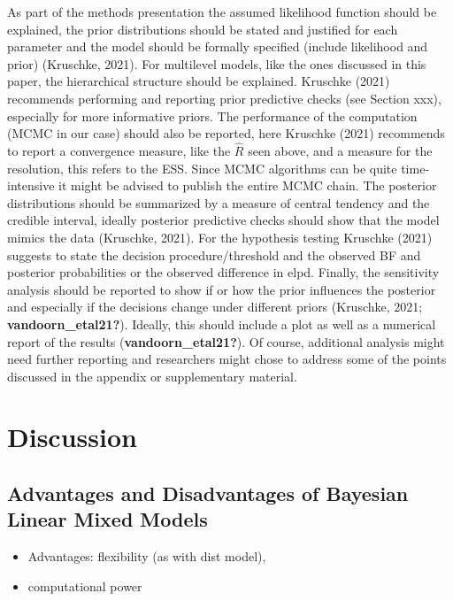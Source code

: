 \documentclass[
  doc,12pt,floatsintext]{apa7}
\providecommand{\tightlist}{%
  \setlength{\itemsep}{0pt}\setlength{\parskip}{0pt}}
\begin{document}
As part of the methods presentation the assumed likelihood function should be explained, the prior distributions should be stated and justified for each parameter and the model should be formally specified (include likelihood and prior) (Kruschke, 2021). For multilevel models, like the ones discussed in this paper, the hierarchical structure should be explained. Kruschke (2021) recommends performing and reporting prior predictive checks (see Section xxx), especially for more informative priors. The performance of the computation (MCMC in our case) should also be reported, here Kruschke (2021) recommends to report a convergence measure, like the \(\hat{R}\) seen above, and a measure for the resolution, this refers to the ESS. Since MCMC algorithms can be quite time-intensive it might be advised to publish the entire MCMC chain. The posterior distributions should be summarized by a measure of central tendency and the credible interval, ideally posterior predictive checks should show that the model mimics the data (Kruschke, 2021). For the hypothesis testing Kruschke (2021) suggests to state the decision procedure/threshold and the observed BF and posterior probabilities or the observed difference in elpd. Finally, the sensitivity analysis should be reported to show if or how the prior influences the posterior and especially if the decisions change under different priors (Kruschke, 2021; \textbf{vandoorn\_etal21?}). Ideally, this should include a plot as well as a numerical report of the results (\textbf{vandoorn\_etal21?}). Of course, additional analysis might need further reporting and researchers might chose to address some of the points discussed in the appendix or supplementary material.

\section{Discussion}\label{discussion}

\subsection{Advantages and Disadvantages of Bayesian Linear Mixed Models}\label{advantages-and-disadvantages-of-bayesian-linear-mixed-models}

\begin{itemize}
\tightlist
\item
  Advantages: flexibility (as with dist model),
\item
  computational power
\end{itemize}
\end{document}
